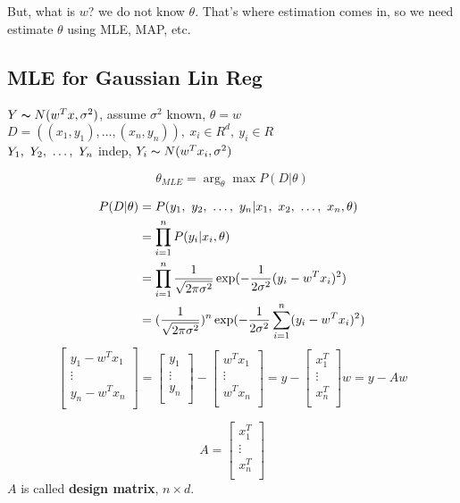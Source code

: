 \documentclass{article}
\begin{document}
But, what is $w$? we do not know $\theta$. That's where estimation comes in, so we need estimate $\theta$
using MLE, MAP, etc.

\subsection{MLE for Gaussian Lin Reg}
$Y \thicksim{N}(w^T x, \sigma^2)$, assume $\sigma^2$ known, $\theta = w$\\
$D = ((x_1, y_1), \ldots, (x_n, y_n)),\ x_i \in R^d,\ y_i \in R$\\
$Y_1,~Y_2,~\ldots,~Y_n$ indep, $Y_i \thicksim{N}(w^T x_i, \sigma^2)$

$$\theta_{MLE} = \arg_\theta \max P(D|\theta)$$

$$
\begin{aligned}
P(D|\theta)
& = P(y_1,~y_2,~\ldots,~y_n|x_1,~x_2,~\ldots,~x_n,\theta) \\
& = \prod_{i=1}^n P(y_i|x_i,\theta) \\
& = \prod_{i=1}^n \dfrac{1}{\sqrt{2\pi \sigma^2}} \exp(- \dfrac{1}{2\sigma^2}(y_i - w^T x_i)^2) \\
& = (\dfrac{1}{\sqrt{2\pi \sigma^2}})^n \exp(- \dfrac{1}{2\sigma^2} \sum_{i=1}^n (y_i - w^T x_i)^2) \\
\end{aligned}
$$
$$
\begin{bmatrix}
y_1 - w^T x_1 \\
\vdots \\
y_n - w^T x_n \\
\end{bmatrix}
=
\begin{bmatrix}
y_1 \\
\vdots \\
y_n \\
\end{bmatrix}
-
\begin{bmatrix}
w^T x_1 \\
\vdots \\
w^T x_n \\
\end{bmatrix}
=
y -
\begin{bmatrix}
x_1^T \\
\vdots \\
x_n^T \\
\end{bmatrix}
w
= y - A w
$$

$$
A = 
\begin{bmatrix}
x_1^T \\
\vdots \\
x_n^T \\
\end{bmatrix}
$$
$A$ is called \textbf{design matrix}, $n \times d$.
\end{document}
